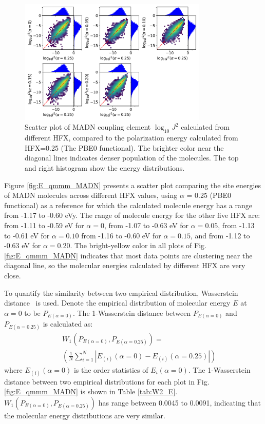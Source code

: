\documentclass[%
 reprint,
 amsmath,amssymb,
 aps,
]{revtex4-2}
\begin{document}
\begin{figure}
  \centering
  \includegraphics[width=0.80\textwidth]{figs/scatterJ_all.pdf}
  \caption{Scatter plot of MADN coupling element $\log_{10} J^2$ calculated from different HFX, compared to the polarization energy calculated from HFX=0.25 (The PBE0 functional). The brighter color near the diagonal lines indicates denser population of the molecules.  The top and right histogram show the energy distributions.}
  \label{fig:J_MADN}
\end{figure}

Figure \ref{fig:E_qmmm_MADN} presents a scatter plot comparing the site energies of MADN molecules across different HFX values, using $\alpha$ = 0.25 (PBE0 functional) as a reference for which the calculated molecule energy has a range from -1.17 to -0.60 \unit[]{eV}y.
The range of molecule energy for the other five HFX are: 
from -1.11 to -0.59 \unit[]{eV} for $\alpha=0$, 
from -1.07 to -0.63 \unit[]{eV} for $\alpha=0.05$, 
from -1.13 to -0.61 \unit[]{eV} for $\alpha=0.10$
from -1.16 to -0.60 \unit[]{eV} for $\alpha=0.15$, 
and from -1.12 to -0.63 \unit[]{eV} for $\alpha=0.20$.
The bright-yellow color in all plots of Fig. \ref{fig:E_qmmm_MADN} indicates that most data points are clustering near the diagonal line, so the molecular energies calculated by different HFX are very close.

To quantify the similarity between two empirical distribution, Wasserstein distance~\cite{villani_optimal_2009} is used.
Denote the empirical distribution of molecular energy $E$ at $\alpha=0$ to be $P_{E(\alpha=0)}$. 
The 1-Wasserstein distance between $P_{E(\alpha=0)}$ and $P_{E(\alpha=0.25)}$ is calculated as:
\begin{eqnarray}
    && W_1 (P_{E(\alpha=0)}, P_{E(\alpha=0.25)}) = \nonumber \\
    && (\frac{1}{N} \sum\limits_{i=1}^N | E_{(i)}(\alpha=0) - E_{(i)}(\alpha=0.25) |)
\end{eqnarray}
where $E_{(i)}(\alpha=0)$ is the order statistics of $E_i(\alpha=0)$. The 1-Wasserstein distance between two empirical distributions for each plot in Fig. \ref{fig:E_qmmm_MADN} is shown in Table \ref{tab:W2_E}. $W_1 (P_{E(\alpha=0)}, P_{E(\alpha=0.25)})$ has range between 0.0045 to 0.0091, indicating that the molecular energy distributions are very similar. 
\end{document}
